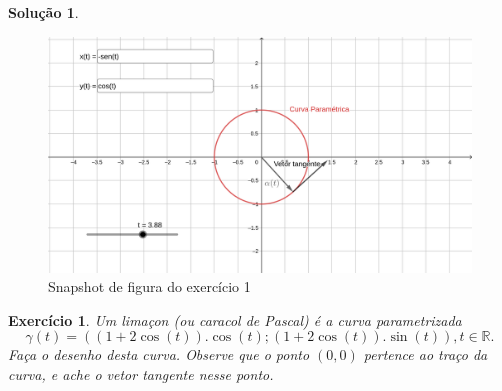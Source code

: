 \documentclass[a4paper,12pt]{article}
\newcommand{\R}{\mathbb{R}}
\theoremstyle{exer}
\newtheorem{exercise}{Exercício}
\theoremstyle{definition}
\newtheorem{solution}{Solução}
\theoremstyle{plain}
\begin{document}
\begin{solution}
    \begin{figure}[H]
        \centering
        \includegraphics[width=\textwidth]{images/exe1.png}
        \caption{Snapshot de figura do exercício 1}
        \label{fig-exe1}
    \end{figure}

\end{solution}

\begin{exercise}
    Um {\it limaçon} (ou caracol de Pascal) é a curva parametrizada
    $$\gamma(t) = ((1 + 2\cos(t)).\cos(t); (1 + 2\cos(t)).\sin(t)), t \in \R.$$
    Faça o desenho desta curva. Observe que o ponto $(0, 0)$ pertence ao traço
    da curva, e ache o vetor tangente nesse ponto.
\end{exercise}
\end{document}
